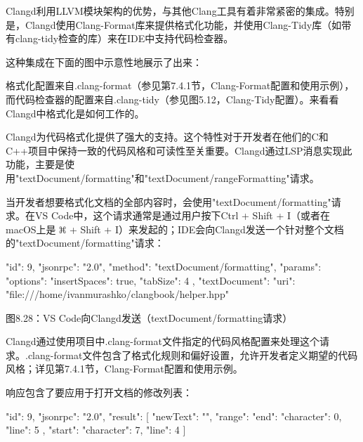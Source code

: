 Clangd利用LLVM模块架构的优势，与其他Clang工具有着非常紧密的集成。特别是，Clangd使用Clang-Format库来提供格式化功能，并使用Clang-Tidy库（如带有clang-tidy检查的库）来在IDE中支持代码检查器。

这种集成在下面的图中示意性地展示了出来：


格式化配置来自.clang-format（参见第7.4.1节，Clang-Format配置和使用示例），而代码检查器的配置来自.clang-tidy（参见图5.12，Clang-Tidy配置）。来看看Clangd中格式化是如何工作的。


Clangd为代码格式化提供了强大的支持。这个特性对于开发者在他们的C和C++项目中保持一致的代码风格和可读性至关重要。Clangd通过LSP消息实现此功能，主要是使用"textDocument/formatting"和"textDocument/rangeFormatting"请求。


当开发者想要格式化文档的全部内容时，会使用"textDocument/formatting"请求。在VS Code中，这个请求通常是通过用户按下Ctrl + Shift + I（或者在macOS上是 \includegraphics[width=0.02\textwidth]{content/part2/chapter8/images/3.png} + Shift + I）来发起的；IDE会向Clangd发送一个针对整个文档的"textDocument/formatting"请求：

\begin{shell}
{
  "id": 9,
  "jsonrpc": "2.0",
  "method": "textDocument/formatting",
  "params": {
    "options": {
      "insertSpaces": true,
      "tabSize": 4
    },
    "textDocument": {
      "uri": "file:///home/ivanmurashko/clangbook/helper.hpp"
    }
  }
}
\end{shell}


\begin{center}
图8.28：VS Code向Clangd发送（textDocument/formatting请求）
\end{center}

Clangd通过使用项目中.clang-format文件指定的代码风格配置来处理这个请求。.clang-format文件包含了格式化规则和偏好设置，允许开发者定义期望的代码风格；详见第7.4.1节，Clang-Format配置和使用示例。

响应包含了要应用于打开文档的修改列表：

\begin{shell}
{
  "id": 9,
  "jsonrpc": "2.0",
  "result": [
  {
    "newText": "\n  ",
    "range": {
      "end": {
        "character": 0,
        "line": 5
      },
      "start": {
        "character": 7,
        "line": 4
      }
    }
  }
  ]
}
\end{shell}


